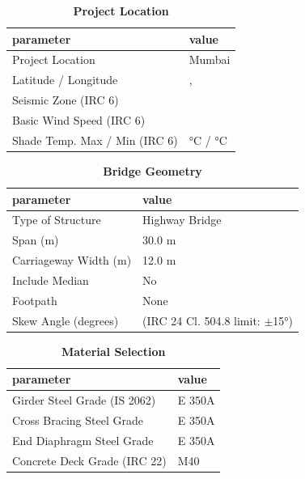 \documentclass[12pt,a4paper]{report}
\numberwithin{table}{chapter}
\numberwithin{figure}{chapter}
\begin{document}
\begin{table}[H]
\caption{\textbf{Project Location}}
\label{subsec:project-location}
\begin{tabular}{|L{5.5cm}|L{8.5cm}|}
\hline
\textbf{parameter} & \textbf{value} \\
\hline
\textnormal{Project Location} & Mumbai \\
\hline
\textnormal{Latitude / Longitude} & ,  \\
\hline
\textnormal{Seismic Zone (IRC 6)} &  \\
\hline
\textnormal{Basic Wind Speed (IRC 6)} &  \\
\hline
\textnormal{Shade Temp. Max / Min (IRC 6)} &  °C /  °C \\
\hline
\end{tabular}
\vspace{0.4cm}
\end{table}

\begin{table}[H]
\caption{\textbf{Bridge Geometry}}
\label{subsec:bridge-geometry}
\begin{tabular}{|L{5.5cm}|L{8.5cm}|}
\hline
\textbf{parameter} & \textbf{value} \\
\hline
\textnormal{Type of Structure} & Highway Bridge \\
\hline
\textnormal{Span (m)} & 30.0 m \\
\hline
\textnormal{Carriageway Width (m)} & 12.0 m \\
\hline
\textnormal{Include Median} & No \\
\hline
\textnormal{Footpath} & None \\
\hline
\textnormal{Skew Angle (degrees)} &  (IRC 24 Cl. 504.8 limit: $\pm$15°) \\
\hline
\end{tabular}
\end{table}
\vspace{0.4cm}

\begin{table}[H]
\caption{\textbf{Material Selection}}
\label{subsec:material}
\begin{tabular}{|L{5.5cm}|L{8.5cm}|}
\hline
\textbf{parameter} & \textbf{value} \\
\hline
\textnormal{Girder Steel Grade (IS 2062)} & E 350A \\
\hline
\textnormal{Cross Bracing Steel Grade} & E 350A \\
\hline
\textnormal{End Diaphragm Steel Grade} & E 350A \\
\hline
\textnormal{Concrete Deck Grade (IRC 22)} & M40 \\
\hline
\end{tabular}
\end{table}
\vspace{0.4cm}
\end{document}
